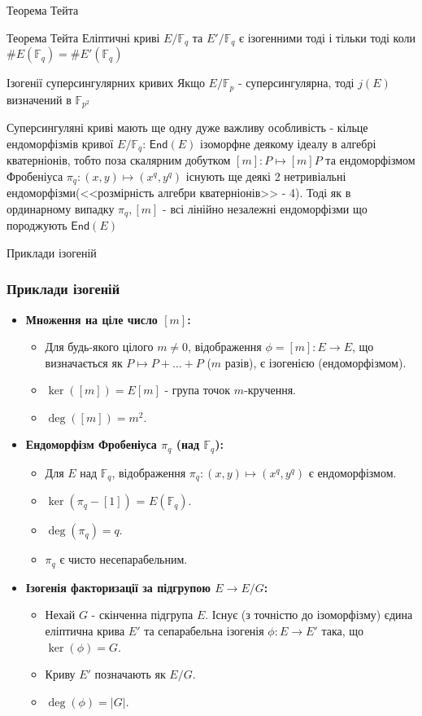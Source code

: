 \documentclass[9pt]{beamer}
\begin{document}
\begin{darkframes}
\begin{frame}{Теорема Тейта}
    \begin{block}{Теорема Тейта}
        Еліптичні криві $E/\mathbb{F}_q$ та $E'/\mathbb{F}_q$ є ізогенними тоді і тільки тоді коли $\#E(\mathbb{F}_q) = \#E'(\mathbb{F}_q)$
    \end{block}
    \begin{block}{Ізогенії суперсингулярних кривих}
        Якщо $E/\mathbb{F}_p$ - суперсингулярна, тоді $j(E)$ визначений в $\mathbb{F}_{p^2}$
    \end{block}
    Суперсингуляні криві мають ще одну дуже важливу особливість - кільце ендоморфізмів кривої $E/\mathbb{F}_q$: $\mathsf{End}(E)$ ізоморфне деякому ідеалу в алгебрі кватерніонів, тобто поза скалярним добутком $[m]:P \mapsto [m]P$ та ендоморфізмом Фробеніуса $\pi_q:(x,y) \mapsto(x^q,y^q)$ існують ще деякі 2 нетривіальні ендоморфізми(<<розмірність алгебри кватерніонів>> - 4). Тоді як в ординарному випадку $\pi_q,[m]$ - всі лінійно незалежні ендоморфізми що породжують $\mathsf{End}(E)$
\end{frame}

\begin{frame}{Приклади ізогеній}
  \frametitle{Приклади ізогеній}
  \begin{itemize}
    \item \textbf{Множення на ціле число $[m]$:}
      \begin{itemize}
        \item Для будь-якого цілого $m \neq 0$, відображення $\phi = [m]: E \to E$, що визначається як $P \mapsto P + \dots + P$ ($m$ разів), є ізогенією (ендоморфізмом).
        \item $\ker([m]) = E[m]$ - група точок $m$-кручення.
        \item $\deg([m]) = m^2$.
      \end{itemize}
    \item \textbf{Ендоморфізм Фробеніуса $\pi_q$ (над $\mathbb{F}_q$):}
      \begin{itemize}
        \item Для $E$ над $\mathbb{F}_q$, відображення $\pi_q: (x, y) \mapsto (x^q, y^q)$ є ендоморфізмом.
        \item $\ker(\pi_q - [1])$ = $E(\mathbb{F}_q)$.
        \item $\deg(\pi_q) = q$.
        \item $\pi_q$ є чисто несепарабельним.
      \end{itemize}
    \item \textbf{Ізогенія факторизації за підгрупою $E \to E/G$:}
      \begin{itemize}
        \item Нехай $G$ - скінченна підгрупа $E$. Існує (з точністю до ізоморфізму) єдина еліптична крива $E'$ та сепарабельна ізогенія $\phi: E \to E'$ така, що $\ker(\phi) = G$.
        \item Криву $E'$ позначають як $E/G$.
        \item $\deg(\phi) = |G|$.
      \end{itemize}
  \end{itemize}
\end{frame}


\end{darkframes}
\end{document}
